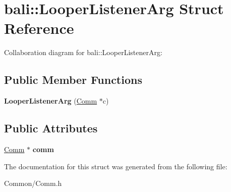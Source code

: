 \hypertarget{structbali_1_1_looper_listener_arg}{\section{bali\-:\-:Looper\-Listener\-Arg Struct Reference}
\label{structbali_1_1_looper_listener_arg}
}


Collaboration diagram for bali\-:\-:Looper\-Listener\-Arg\-:
\subsection*{Public Member Functions}
\begin{DoxyCompactItemize}
\item 
\hypertarget{structbali_1_1_looper_listener_arg_a52ce0fc2887c19e7494bb729558b18fc}{{\bfseries Looper\-Listener\-Arg} (\hyperlink{classbali_1_1_comm}{Comm} $\ast$c)}\label{structbali_1_1_looper_listener_arg_a52ce0fc2887c19e7494bb729558b18fc}

\end{DoxyCompactItemize}
\subsection*{Public Attributes}
\begin{DoxyCompactItemize}
\item 
\hypertarget{structbali_1_1_looper_listener_arg_ad9abb50d737bc1c3fc9db52871795809}{\hyperlink{classbali_1_1_comm}{Comm} $\ast$ {\bfseries comm}}\label{structbali_1_1_looper_listener_arg_ad9abb50d737bc1c3fc9db52871795809}

\end{DoxyCompactItemize}


The documentation for this struct was generated from the following file\-:\begin{DoxyCompactItemize}
\item 
Common/Comm.\-h\end{DoxyCompactItemize}
